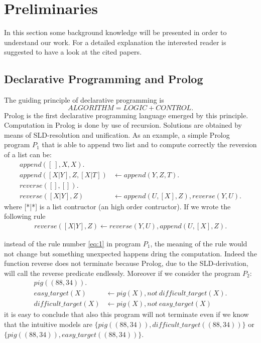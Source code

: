 \section{Preliminaries}
\label{sec:prelim}

In this section some background knowledge will be presented in order to understand our work. For a detailed explanation the interested reader is suggested to have a look at the cited papers. 
\subsection{Declarative Programming and Prolog}
The guiding principle of declarative programming is 
\[ALGORITHM = LOGIC + CONTROL.\]
Prolog is the first declarative programming language emerged by this principle. Computation in Prolog is done by use of recursion. Solutions are obtained by means of SLD-resolution and unification. As an example, a simple Prolog program \(P_1\) that  is able to append two list and to compute correctly the reversion of a list can be: 
\begin{align}
append ([\:], X, X).& \\
append ([X|Y], Z, [X|T ]) &\leftarrow append (Y, Z, T ). \\
reverse([ ], [ ]).&\\
reverse([X|Y ], Z) &\leftarrow append (U, [X], Z), reverse(Y, U ). \label{eq:1}
\end{align}
where [*|*] is a list contructor (an high order contructor).
If we wrote the following rule 
\begin{align}
reverse([X|Y ], Z) \leftarrow reverse(Y, U ), append(U, [X], Z). \label{eq:2}
\end{align}

instead of the rule number \ref{eq:1} in program \(P_1\), the meaning of the rule would not change but something unexpected happens dring the computation. Indeed the function reverse does not terminate because Prolog, due to the SLD-derivation, will call the reverse predicate endlessly. Moreover if we consider the program  \(P_2\):
\begin{align}
pig((88,34)).& \\
easy\_target(X) &\leftarrow pig(X), not\: difficult\_target(X). \\ 
difficult\_target(X) &\leftarrow pig(X), not\: easy\_target(X) 
\end{align}
it is easy to conclude that also this program will not terminate even if we know that the intuitive models are \(\{pig((88,34)), difficult\_target((88,34))\}\) or \\ \(\{pig((88,34)), easy\_target((88,34))\}\).

